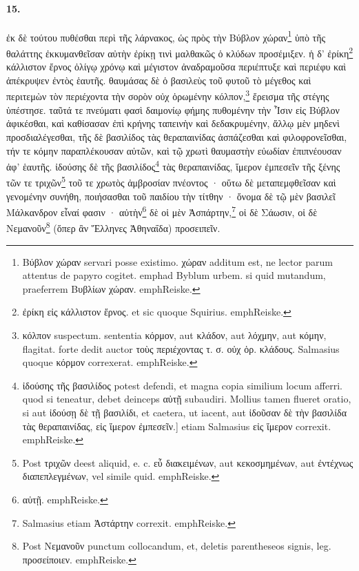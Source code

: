 \documentclass[a4paper, 11pt, oneside, polutonikogreek, german]{article}
\begin{document}
\paragraph{15.}
ἐκ δὲ τούτου πυθέσθαι περὶ τῆς λάρνακος, ὡς πρὸς τὴν Βύβλον χώραν\footnote{Βύβλον χώραν servari posse existimo. χώραν additum est, ne lector parum attentus de papyro cogitet. emph{ad Byblum urbem.} si quid mutandum, praeferrem Βυβλίων χώραν. emph{Reiske.}} ὑπὸ τῆς θαλάττης ἐκκυμανθεῖσαν αὐτὴν ἐρίκῃ τινὶ μαλθακῶς ὁ κλύδων προσέμιξεν. ἡ δ' ἐρίκη\footnote{ἐρίκη εἰς κάλλιστον ἔρνος. et sic quoque Squirius. emph{Reiske.}} κάλλιστον ἔρνος ὀλίγῳ χρόνῳ καὶ μέγιστον ἀναδραμοῦσα περιέπτυξε καὶ περιέφυ καὶ ἀπέκρυψεν ἐντὸς ἑαυτῆς. θαυμάσας δὲ ὁ βασιλεὺς τοῦ φυτοῦ τὸ μέγεθος καὶ περιτεμὼν τὸν περιέχοντα τὴν σορὸν οὐχ ὁρωμένην κόλπον,\footnote{κόλπον suspectum. sententia κόρμον, aut κλάδον, aut λόχμην, aut κόμην, flagitat. forte dedit auctor τοὺς περιέχοντας τ. σ. οὐχ ὁρ. κλάδους. Salmasius quoque κόρμον correxerat. emph{Reiske.}} ἔρεισμα τῆς στέγης ὑπέστησε. ταῦτά τε πνεύματι φασὶ δαιμονίῳ φήμης πυθομένην τὴν Ἶσιν εἰς Βύβλον ἀφικέσθαι, καὶ καθίσασαν ἐπὶ κρήνης ταπεινὴν καὶ δεδακρυμένην, ἄλλῳ μὲν μηδενὶ προσδιαλέγεσθαι, τῆς δὲ βασιλίδος τὰς θεραπαινίδας ἀσπάζεσθαι καὶ φιλοφρονεῖσθαι, τήν τε κόμην παραπλέκουσαν αὐτῶν, καὶ τῷ χρωτὶ θαυμαστὴν εὐωδίαν ἐπιπνέουσαν ἀφ' ἑαυτῆς. ἰδούσης δὲ τῆς βασιλίδος\footnote{ἰδούσης τῆς βασιλίδος potest defendi, et magna copia similium locum afferri. quod si teneatur, debet deinceps αὐτῇ subaudiri. Mollius tamen flueret oratio, si aut ἰδούσῃ δὲ τῇ βασιλίδι, et caetera, ut iacent, aut ἰδοῦσαν δὲ τὴν βασιλίδα τὰς θεραπαινίδας, εἰς ἵμερον ἐμπεσεῖν.] etiam Salmasius εἰς ἵμερον correxit. emph{Reiske.}} τὰς θεραπαινίδας, ἵμερον ἐμπεσεῖν τῆς ξένης τῶν τε τριχῶν\footnote{Post τριχῶν deest aliquid, e. c. εὖ διακειμένων, aut κεκοσμημένων, aut ἐντέχνως διαπεπλεγμένων, vel simile quid. emph{Reiske.}} τοῦ τε χρωτὸς ἀμβροσίαν πνέοντος · οὕτω δὲ μεταπεμφθεῖσαν καὶ γενομένην συνήθη, ποιήσασθαι τοῦ παιδίου τὴν τίτθην · ὄνομα δὲ τῷ μὲν βασιλεῖ Μάλκανδρον εἶναί φασιν · αὐτὴν\footnote{αὐτῇ. emph{Reiske.}} δὲ οἱ μὲν Ἀσπάρτην,\footnote{Salmasius etiam Ἀστάρτην correxit. emph{Reiske.}} οἱ δὲ Σάωσιν, οἱ δὲ Νεμανοῦν\footnote{Post Νεμανοῦν punctum collocandum, et, deletis parentheseos signis, leg. προσείποιεν. emph{Reiske.}} (ὅπερ ἂν Ἕλληνες Ἀθηναΐδα) προσειπεῖν.
\end{document}

